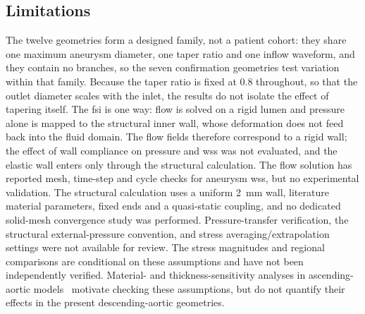\documentclass[12pt,a4paper]{article}
\newcommand{\cfdrevision}[1]{#1} %
\newcommand{\FSI}{\ac{fsi}\xspace}
\newcommand{\WSS}{\ac{wss}\xspace}
\theoremstyle{definition}
\numberwithin{equation}{section}
\providecommand{\DIFaddtex}[1]{{\protect\color{blue} \sf #1}} %
\providecommand{\DIFdeltex}[1]{{\protect\color{red} \scriptsize #1}} %
\providecommand{\DIFaddbegin}{} %
\providecommand{\DIFaddend}{} %
\providecommand{\DIFdelbegin}{} %
\providecommand{\DIFdelend}{} %
\providecommand{\DIFadd}[1]{\texorpdfstring{\DIFaddtex{#1}}{#1}} %
\providecommand{\DIFdel}[1]{\texorpdfstring{\DIFdeltex{#1}}{}} %
\newcommand{\DIFscaledelfig}{0.5}
\newlength{\DIFdelgraphicswidth} %
\newlength{\DIFdelgraphicsheight} %
\newcommand{\DIFaddincludegraphics}[2][]{{\color{blue}\fbox{\DIFOincludegraphics[#1]{#2}}}} %
\newcommand{\DIFdelincludegraphics}[2][]{%
\sbox{\DIFdelgraphicsbox}{\DIFOincludegraphics[#1]{#2}}%
\settoboxwidth{\DIFdelgraphicswidth}{\DIFdelgraphicsbox} %
\settoboxtotalheight{\DIFdelgraphicsheight}{\DIFdelgraphicsbox} %
\scalebox{\DIFscaledelfig}{%
\parbox[b]{\DIFdelgraphicswidth}{\usebox{\DIFdelgraphicsbox}\\[-\baselineskip] \rule{\DIFdelgraphicswidth}{0em}}\llap{\resizebox{\DIFdelgraphicswidth}{\DIFdelgraphicsheight}{%
\setlength{\unitlength}{\DIFdelgraphicswidth}%
\begin{picture}(1,1)%
\thicklines\linethickness{2pt} %
{\color[rgb]{1,0,0}\put(0,0){\framebox(1,1){}}}%
{\color[rgb]{1,0,0}\put(0,0){\line( 1,1){1}}}%
{\color[rgb]{1,0,0}\put(0,1){\line(1,-1){1}}}%
\end{picture}%
}\hspace*{3pt}}} %
} %
\DeclareRobustCommand{\DIFaddbegin}{\DIFOaddbegin \let\includegraphics\DIFaddincludegraphics} %
\DeclareRobustCommand{\DIFaddend}{\DIFOaddend \let\includegraphics\DIFOincludegraphics} %
\DeclareRobustCommand{\DIFdelbegin}{\DIFOdelbegin \let\includegraphics\DIFdelincludegraphics} %
\DeclareRobustCommand{\DIFdelend}{\DIFOaddend \let\includegraphics\DIFOincludegraphics} %
\renewcommand{\DIFaddtex}[1]{{\protect\color{red}#1}}
\renewcommand{\DIFdeltex}[1]{}
\renewcommand{\DIFdel}[1]{}
\renewcommand{\DIFaddincludegraphics}[2][]{\DIFOincludegraphics[#1]{#2}}
\renewcommand{\DIFdelincludegraphics}[2][]{}
\renewcommand{\cfdrevision}[1]{\textcolor{red}{#1}}
\def\DIFaddbegin{}\def\DIFaddend{}%
\def\DIFdelbegin{}\def\DIFdelend{}%
\def\cfdrevision#1{#1}%
\begin{document}
\subsection{Limitations}
\label{Limitations}
The twelve geometries form a designed family, not a patient cohort: they share one maximum aneurysm diameter, one taper ratio and one inflow waveform, and they contain no branches, so the seven confirmation geometries test variation within that family. Because the taper ratio is fixed at 0.8 throughout, so that the outlet diameter scales with the inlet, the results do not isolate the effect of tapering itself. \DIFdelbegin \DIFdel{The }%
\DIFdel{is one way: the flow is solved on a rigid lumen and its wall tractions are then mapped to the structural model, whose deformation does not feed back into the fluid domain. The flow fields therefore correspond to a rigid wall, so wall compliance, which would damp the pressure wave and reduce the peak }%
\DIFdel{, is not represented, and the elastic wall enters only through the structural calculation. The flow }\DIFdelend \DIFaddbegin \DIFadd{\cfdrevision{The \FSI is one way: flow is solved on a rigid lumen and pressure alone is mapped to the structural inner wall, whose deformation does not feed back into the fluid domain.} \cfdrevision{The flow fields therefore correspond to a rigid wall; the effect of wall compliance on pressure and \WSS was not evaluated, and the elastic wall enters only through the structural calculation.} The flow }\DIFaddend solution has reported mesh, time-step and cycle checks for aneurysm \WSS, but no experimental validation. The structural calculation uses a uniform 2~mm wall, literature material parameters, fixed ends and a quasi-static coupling, \DIFdelbegin \DIFdel{so its stress fields indicate relative loading patterns rather than absolute magnitudes.
}\DIFdelend \DIFaddbegin \DIFadd{\cfdrevision{and no dedicated solid-mesh convergence study was performed. Pressure-transfer verification, the structural external-pressure convention, and stress averaging/extrapolation settings were not available for review. The stress magnitudes and regional comparisons are conditional on these assumptions and have not been independently verified. Material- and thickness-sensitivity analyses in ascending-aortic models~\cite{zhu2025material} motivate checking these assumptions, but do not quantify their effects in the present descending-aortic geometries.}
}\DIFaddend 
\end{document}
